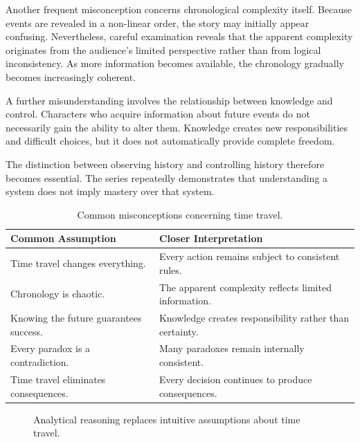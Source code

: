 \documentclass[12pt,oneside,openany]{book}
\begin{document}
Another frequent misconception concerns chronological complexity itself.
Because events are revealed in a non-linear order, the story may initially
appear confusing. Nevertheless, careful examination reveals that the apparent
complexity originates from the audience's limited perspective rather than from
logical inconsistency. As more information becomes available, the chronology
gradually becomes increasingly coherent.

A further misunderstanding involves the relationship between knowledge and
control. Characters who acquire information about future events do not
necessarily gain the ability to alter them. Knowledge creates new
responsibilities and difficult choices, but it does not automatically provide
complete freedom.

The distinction between observing history and controlling history therefore
becomes essential. The series repeatedly demonstrates that understanding a
system does not imply mastery over that system.

\begin{table}[H]
\centering
\begin{tabular}{|p{5cm}|p{7cm}|}
\hline
\textbf{Common Assumption} & \textbf{Closer Interpretation}\\
\hline
Time travel changes everything. & Every action remains subject to consistent rules.\\
\hline
Chronology is chaotic. & The apparent complexity reflects limited information.\\
\hline
Knowing the future guarantees success. & Knowledge creates responsibility rather than certainty.\\
\hline
Every paradox is a contradiction. & Many paradoxes remain internally consistent.\\
\hline
Time travel eliminates consequences. & Every decision continues to produce consequences.\\
\hline
\end{tabular}
\caption{Common misconceptions concerning time travel.}
\end{table}

\begin{figure}[H]
\centering
{}

\caption{Analytical reasoning replaces intuitive assumptions about time travel.}
\end{figure}
\end{document}
